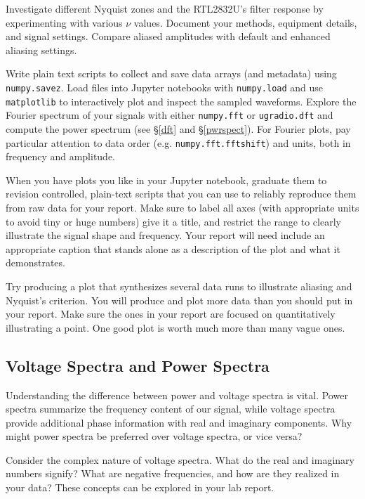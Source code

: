 \documentclass[11pt,preprint]{aastex}
\begin{document}
Investigate different Nyquist zones and the RTL2832U's filter response by experimenting with various $\nu$ values. Document your methods, equipment details, and signal settings. Compare aliased amplitudes with default and enhanced aliasing settings.

Write plain text scripts to collect and save data arrays (and metadata) using {\tt numpy.savez}. Load files into Jupyter notebooks with {\tt numpy.load} and use {\tt matplotlib} to interactively plot and inspect the sampled waveforms. 
Explore the Fourier spectrum of your signals with either {\tt numpy.fft} or {\tt ugradio.dft} and compute the power spectrum (see \S\ref{dft} and \S\ref{pwrspect}).
For Fourier plots, pay particular attention to data order (e.g. {\tt numpy.fft.fftshift}) and units, both in frequency and amplitude.

When you have plots you like in your Jupyter notebook, graduate them to revision controlled, plain-text scripts that you can use to reliably reproduce them from raw data for your report.
Make sure to label all axes (with appropriate units to avoid tiny or huge numbers)
give it a title, and restrict the range to clearly illustrate
the signal shape and frequency.
Your report will need include an appropriate caption that
stands alone as a description of the plot and what it demonstrates.

Try producing a plot that synthesizes several data runs to illustrate aliasing and Nyquist's criterion.
You will produce and plot more data than you should put in your report.
Make sure the ones in your report are focused on quantitatively illustrating a point.
One good plot is worth much more than many vague ones.


\subsection{Voltage Spectra and Power Spectra}

\noindent
Understanding the difference between power and voltage spectra is vital.
Power spectra summarize the frequency content of our signal, while voltage spectra provide additional phase information with real and imaginary components.
Why might power spectra be preferred over voltage spectra, or vice versa?

Consider the complex nature of voltage spectra. What do the real and imaginary numbers signify? What are negative frequencies, and how are they realized in your data? These concepts can be explored in your lab report.
\end{document}
